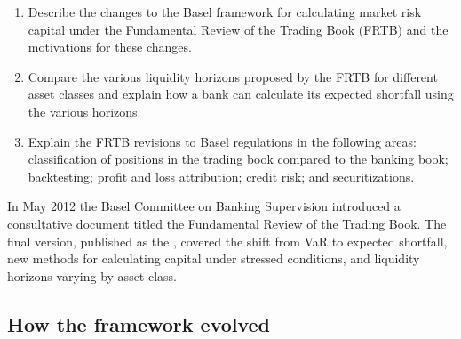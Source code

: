 
\begin{mrkeybox}[title={Learning objectives in this reading}]
\small
\begin{enumerate}[label=\textbf{\alph*.},leftmargin=1.7em]
\item Describe the changes to the Basel framework for calculating market risk capital under the
      Fundamental Review of the Trading Book (FRTB) and the motivations for these changes.
\item Compare the various liquidity horizons proposed by the FRTB for different asset classes
      and explain how a bank can calculate its expected shortfall using the various horizons.
\item Explain the FRTB revisions to Basel regulations in the following areas: classification of
      positions in the trading book compared to the banking book; backtesting; profit and loss
      attribution; credit risk; and securitizations.
\end{enumerate}
\end{mrkeybox}


In May 2012 the Basel Committee on Banking Supervision introduced a consultative document titled
the Fundamental Review of the Trading Book. The final version, published as the , covered the shift from VaR to expected shortfall, new
methods for calculating capital under stressed conditions, and liquidity horizons varying by
asset class.

\subsection{How the framework evolved}

